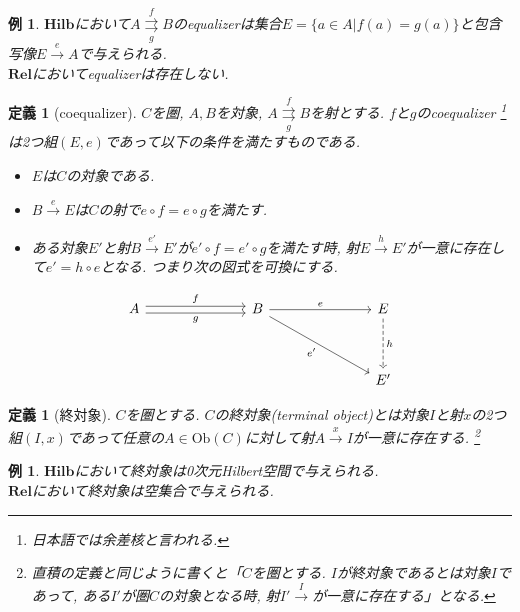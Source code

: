 \documentclass[a4paper,12pt]{ltjsarticle}
\theoremstyle{break}
\newtheorem{defn}[thm]{定義}
\newtheorem{eg}[thm]{例}
\newcommand{\rel}{\mathbf{Rel}}
\newcommand{\hilb}{\mathbf{Hilb}}
\newcommand{\Ob}{\mathrm{Ob}}
\newcommand{\xr}[1]{\xrightarrow{#1}}
\newcommand{\ci}{\circ}
\numberwithin{equation}{section}
\begin{document}
\begin{eg}
  $\hilb$において$A \overset{f}{\underset{g}{\rightrightarrows}} B$のequalizerは集合$E=\{ a \in A | f(a)=g(a) \}$と包含写像$E \xr{e} A$で与えられる. \\
  $\rel$においてequalizerは存在しない. 
\end{eg}  

\begin{defn}[coequalizer]
  $C$を圏, $A, B$を対象, $A \overset{f}{\underset{g}{\rightrightarrows}} B$を射とする. 
  $f$と$g$のcoequalizer
  \footnote{
    日本語では余差核と言われる.
    }
  は2つ組$(E, e)$であって以下の条件を満たすものである. 
  \begin{itemize}
    \item $E$は$C$の対象である. 
    \item $B \xr{e} E$は$C$の射で$e \ci f = e \ci g$を満たす. 
    \item ある対象$E'$と射$B \xr{e'} E'$が$e' \ci f = e' \ci g$を満たす時, 射$E \xr{h} E'$が一意に存在して$e' = h \ci e$となる. 
    つまり次の図式を可換にする. 
  \end{itemize}
  \[\begin{tikzcd}
    A &&& B &&& E \\
    \\
    &&&&&& {E'}
    \arrow["g"', shift right=1, from=1-1, to=1-4]
    \arrow["e", from=1-4, to=1-7]
    \arrow["h", dashed, from=1-7, to=3-7]
    \arrow["{e'}"', from=1-4, to=3-7]
    \arrow["f", shift left=1, from=1-1, to=1-4]
  \end{tikzcd}\]  
\end{defn}

\begin{defn}[終対象]
  $C$を圏とする. 
  $C$の終対象(terminal object)とは対象$I$と射$x$の2つ組$(I,x)$であって任意の$A \in \Ob(C)$に対して射$A \xr{x} I$が一意に存在する.
  \footnote{
  直積の定義と同じように書くと「$C$を圏とする. 
  $I$が終対象であるとは対象$I$であって, ある$I'$が圏$C$の対象となる時, 射$I' \xr I$が一意に存在する」となる. 
  } 
\end{defn}

\begin{eg}
  $\hilb$において終対象は0次元Hilbert空間で与えられる. \\
  $\rel$において終対象は空集合で与えられる. 
\end{eg}
\end{document}
